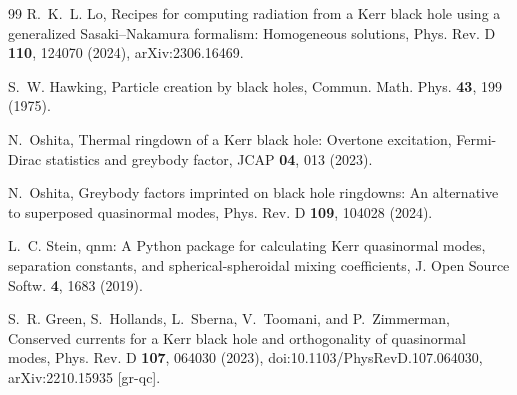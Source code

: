 \documentclass[aps,prd,twocolumn,10pt,nofootinbib,superscriptaddress,floatfix]{revtex4-2}
\begin{document}
\begin{thebibliography}{99}
R.~K.~L. Lo,
Recipes for computing radiation from a Kerr black hole using a generalized
Sasaki--Nakamura formalism: Homogeneous solutions,
Phys. Rev. D \textbf{110}, 124070 (2024),
arXiv:2306.16469.

S.~W. Hawking,
Particle creation by black holes,
Commun. Math. Phys. \textbf{43}, 199 (1975).

N.~Oshita,
Thermal ringdown of a Kerr black hole: Overtone excitation, Fermi-Dirac
statistics and greybody factor,
JCAP \textbf{04}, 013 (2023).

N.~Oshita,
Greybody factors imprinted on black hole ringdowns: An alternative to
superposed quasinormal modes,
Phys. Rev. D \textbf{109}, 104028 (2024).

L.~C. Stein,
qnm: A Python package for calculating Kerr quasinormal modes, separation
constants, and spherical-spheroidal mixing coefficients,
J. Open Source Softw. \textbf{4}, 1683 (2019).

S.~R. Green, S.~Hollands, L.~Sberna, V.~Toomani, and P.~Zimmerman,
Conserved currents for a Kerr black hole and orthogonality of quasinormal
modes,
Phys. Rev. D \textbf{107}, 064030 (2023),
doi:10.1103/PhysRevD.107.064030,
arXiv:2210.15935 [gr-qc].

\end{thebibliography}
\end{document}
